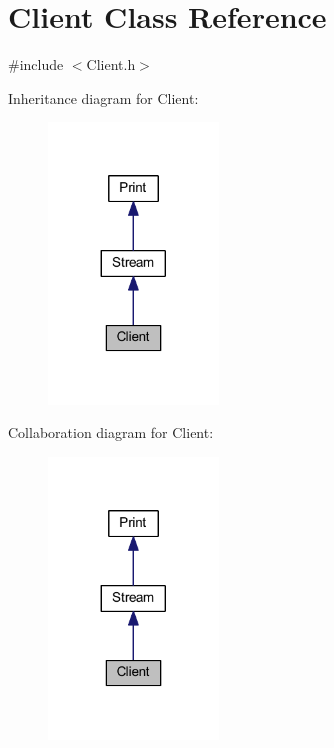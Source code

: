 \hypertarget{class_client}{}\section{Client Class Reference}
\label{class_client}


{\ttfamily \#include $<$Client.\+h$>$}



Inheritance diagram for Client\+:
\nopagebreak
\begin{figure}[H]
\begin{center}
\leavevmode
\includegraphics[width=128pt]{class_client__inherit__graph}
\end{center}
\end{figure}


Collaboration diagram for Client\+:
\nopagebreak
\begin{figure}[H]
\begin{center}
\leavevmode
\includegraphics[width=128pt]{class_client__coll__graph}
\end{center}
\end{figure}
